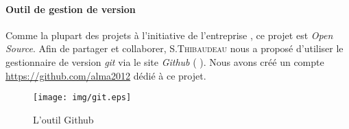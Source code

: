 \paragraph{Outil de gestion de version}
Comme la plupart des projets à l'initiative de l'entreprise \kwobeo, ce projet est \textit{Open Source}. Afin de partager et collaborer, S.\textsc{Thibaudeau} nous a proposé d'utiliser le gestionnaire de version \emph{git} via le site \emph{Github} (\cf{} \cite{git}).%
Nous avons créé un compte \href{alma2012}{https://github.com/alma2012} dédié à ce projet.

\begin{figure}[htb]
  \centering
  \texttt{[image: img/git.eps]}
  \caption{L'outil Github}
\end{figure}

